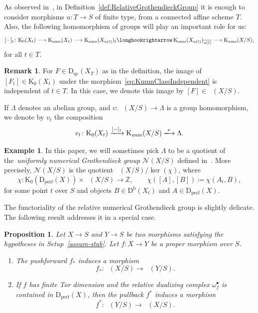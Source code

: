 \documentclass[11pt, reqno]{amsart}
\numberwithin{equation}{section}
\theoremstyle{plain}
\newtheorem{proposition}[theorem]{Proposition}
\theoremstyle{remark}
\theoremstyle{definition}
\newtheorem{example}[theorem]{Example}
\newtheorem{remark}[theorem]{Remark}
\theoremstyle{italicsname}
\newcommand{\Db}{\mathrm{D^b}}
\newcommand{\Dperf}{\mathrm{D}_{\mathrm{perf}}}
\newcommand{\Dqc}{\mathrm{D}_{\mathrm{qc}}}
\newcommand{\num}{\mathrm{num}}
\DeclareMathOperator{\Knum}{\rK_{\num}}
\newcommand{\cN}{\mathcal{N}}
\newcommand{\rK}{\mathrm{K}}
\def\ZZ{\ensuremath{\mathbb{Z}}}
\begin{document}
As observed in~\cite[Remark 21.2]{stability-families}, in Definition~\ref{def:RelativeGrothendieckGroup} it is enough to consider morphisms $u\colon T\to S$ of finite type, from a connected affine scheme $T$.
Also, the following homomorphism of groups will play an important role for us:
\begin{equation}\label{eq:KnumClassIndependent}
[-]_t\colon\rK_0(X_t)\longrightarrow\Knum(X_t)\longrightarrow\Knum(X_{u(t)})_t\longhookrightarrow\Knum(X_{u(t)})_{\overline{u(t)}}\longrightarrow\Knum(X/S),    
\end{equation}
for all $t\in T$.

\begin{remark}\label{rmk:KnumClassIndependent}
For $F\in\Dqc(X_T)$ as in the definition, the image of $[F_t]\in\rK_0(X_t)$ under the morphism~\eqref{eq:KnumClassIndependent} is independent of $t\in T$. 
In this case, we denote this image by $[F]\in\Knum(X/S)$.
\end{remark}

If $\Lambda$ denotes an abelian group, and $v\colon\Knum(X/S)\to\Lambda$ is a group homomorphism, we denote by $v_t$ the composition
\begin{equation}\label{eq:DefOfVt}
v_t\colon\rK_0(X_t)\xlongrightarrow{[-]_t}\Knum(X/S)\xlongrightarrow{v}\Lambda.
\end{equation}

\begin{example}\label{ex:UniformlyNumericalGrothendieck}
In this paper, we will sometimes pick $\Lambda$ to be a quotient of the~\emph{uniformly numerical Grothendieck group} $\cN(X/S)$ defined in~\cite[Proposition and Definition 21.5]{stability-families}.
More precisely, $\cN(X/S)$ is the quotient $\Knum(X/S)/\ker(\chi)$, where
\[
\chi\colon\rK_0(\Dperf(X))\times\Knum(X/S)\longrightarrow\ZZ,\qquad\chi([A],[B])\coloneqq\chi(A_t,B),
\]
for some point $t$ over $S$ and objects $B\in\Db(X_t)$ and $A\in\Dperf(X)$.
\end{example}

The functoriality of the relative numerical Grothendieck group is slightly delicate.
The following result addresses it in a special case.

\begin{proposition}\label{prop:FunctorialityKnum}
Let $X\to S$ and $Y\to S$ be two morphisms satisfying the hypotheses in Setup~\ref{assum-stab}.
Let $f\colon X\to Y$ be a proper morphism over $S$. 
\begin{enumerate}[{\rm (1)}]
\item\label{enum:FunctorialityKnum1} The pushforward $f_*$ induces a morphism
\[
f_*\colon\Knum(X/S)\longrightarrow\Knum(Y/S).
\]
\item\label{enum:FunctorialityKnum2} 
If $f$ has finite Tor dimension and the relative dualizing complex $\omega_f^\bullet$ is contained in $\Dperf(X)$, then the pullback $f^*$ induces a morphism
\[
f^*\colon\Knum(Y/S)\longrightarrow\Knum(X/S).
\]
\end{enumerate}
\end{proposition}
\end{document}
